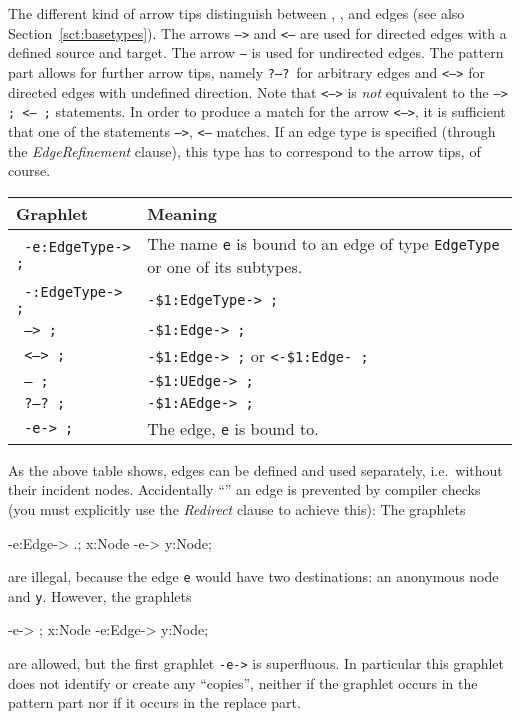 The different kind of arrow tips distinguish between , , and  edges (see also Section~\ref{sct:basetypes}).
The arrows \texttt{-->} and \texttt{<--} are used for directed edges with a defined source and target.
The arrow \texttt{--} is used for undirected edges.
The pattern part allows for further arrow tips, namely \texttt{?--?}\ for arbitrary edges and \texttt{<-->} for directed edges with undefined direction.
Note that \texttt{<-->} is \emph{not} equivalent to the \texttt{--> ; <-- ;} statements.
In order to produce a match for the arrow \texttt{<-->}, it is sufficient that one of the statements \texttt{-->}, \texttt{<--} matches.
If an edge type is specified (through the \emph{EdgeRefinement} clause), this type has to correspond to the arrow tips, of course.
\begin{center}
	\begin{tabularx}{\linewidth}{lX}
		\textbf{Graphlet} & \textbf{Meaning}\\ \hline
		\texttt{ -e:EdgeType-> ;} & The name \texttt{e} is bound to an edge of type \texttt{EdgeType} or one of its subtypes. \\
		\texttt{ -:EdgeType-> ;} & \texttt{-\$1:EdgeType-> ;} \\
		\texttt{ --> ;} & \texttt{-\$1:Edge-> ;} \\
		\texttt{ <--> ;} & \texttt{-\$1:Edge-> ;} or  \texttt{<-\$1:Edge- ;}\\
		\texttt{ -- ;} & \texttt{-\$1:UEdge-> ;} \\
		\texttt{ ?--?\ ;} & \texttt{-\$1:AEdge-> ;} \\
		\texttt{ -e-> ;} & The edge, \texttt{e} is bound to.
	\end{tabularx}
\end{center}
As the above table shows, edges can be defined and used separately, i.e.\ without their incident nodes.
Accidentally ``'' an edge is prevented by compiler checks (you must explicitly use the \emph{Redirect} clause to achieve this):
The graphlets
\begin{grgenlet}
-e:Edge-> .;
x:Node -e-> y:Node;
\end{grgenlet}
are illegal, because the edge \texttt{e} would have two destinations: an anonymous node and \texttt{y}.
However, the graphlets
\begin{grgenlet}
-e-> ;
x:Node -e:Edge-> y:Node;
\end{grgenlet}
are allowed, but the first graphlet \texttt{-e->} is superfluous. In particular this graphlet does not identify or create any ``copies'', neither if the graphlet occurs in the pattern part nor if it occurs in the replace part.
